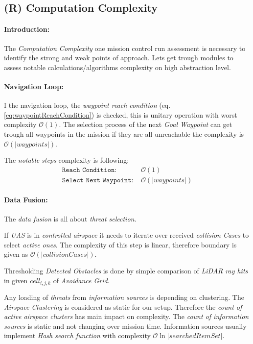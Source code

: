 \subsection{(R) Computation Complexity}\label{sec:MCRcomputationalComplexity}
\paragraph{Introduction:}The \emph{Computation Complexity} one mission control run assessment is necessary to identify the strong and weak points of approach. Lets get trough modules to assess notable calculations/algorithms complexity on high abstraction level.

\paragraph{Navigation Loop:} I the navigation loop, the \emph{waypoint reach condition} (eq. \ref{eq:waypointReachCondition}) is checked, this is unitary operation with worst complexity $\mathscr{O}(1)$. The selection process of the next \emph{Goal Waypoint} can get trough all waypoints in the mission if they are all unreachable the complexity is $\mathscr{O}(|waypoints|)$.

The \emph{notable steps} complexity is following:
\begin{equation*}
    \begin{aligned}
        \texttt{Reach Condition: }& \mathscr{O}(1)\\
        \texttt{Select Next Waypoint: }&\mathscr{O}(|waypoints|)
    \end{aligned}
\end{equation*}

\paragraph{Data Fusion:} The \emph{data fusion} is all about \emph{threat selection}. 

If \emph{UAS} is in \emph{controlled airspace} it needs to iterate over received \emph{collision Cases} to select \emph{active ones}. The complexity of this step is linear, therefore boundary is given as $\mathscr{O} (|collision Cases|)$.

Thresholding \emph{Detected Obstacles} is done by simple comparison of \emph{LiDAR ray hits} in given $cell_{i,j,k}$ of \emph{Avoidance Grid}.

Any loading of \emph{threats} from \emph{information sources} is depending on clustering. The \emph{Airspace Clustering} is considered as static for our setup. Therefore the \emph{count of active airspace clusters} has main impact on complexity. The \emph{count of information sources} is static and not changing over mission time. Information sources usually implement \emph{Hash search function} with complexity $\mathscr{O}\ln|searched Item Set|$.

